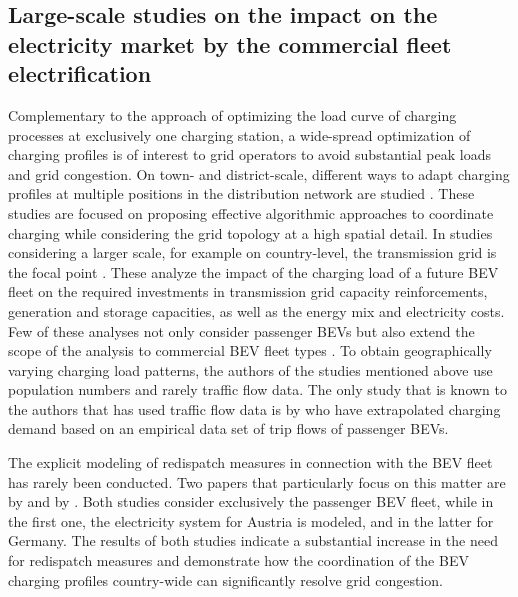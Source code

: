 \documentclass[final,10pt]{elsarticle}
\begin{document}
    \subsection{Large-scale studies on the impact on the electricity market by the commercial fleet electrification} \label{sec:2_2}
        Complementary to the approach of optimizing the load curve of charging processes at exclusively one charging station, a wide-spread optimization of charging profiles is of interest to grid operators to avoid substantial peak loads and grid congestion. On town- and district-scale, different ways to adapt charging profiles at multiple positions in the distribution network are studied \cite{PRAKASH2022108235, OCONNELL2012106}. These studies are focused on proposing effective algorithmic approaches to coordinate charging while considering the grid topology at a high spatial detail. In studies considering a larger scale, for example on country-level, the transmission grid is the focal point \cite{CROZIER2020114973, HARTVIGSSON2022125180}. These analyze the impact of the charging load of a future \ac{BEV} fleet on the required investments in transmission grid capacity reinforcements, generation and storage capacities, as well as the energy mix and electricity costs. Few of these analyses not only consider passenger \ac{BEV}s but also extend the scope of the analysis to commercial \ac{BEV} fleet types \cite{9530709, LI2021111962}. To obtain geographically varying charging load patterns, the authors of the studies mentioned above use population numbers and rarely traffic flow data. The only study that is known to the authors that has used traffic flow data is by \citet{HARTVIGSSON2022125180} who have extrapolated charging demand based on an empirical data set of trip flows of passenger \ac{BEV}s.
        
        The explicit modeling of redispatch measures in connection with the \ac{BEV} fleet has rarely been conducted. Two papers that particularly focus on this matter are by \citet{LOSCHAN2023108802}  and by \citet{STAUDT20181435}. Both studies consider exclusively the passenger \ac{BEV} fleet, while in the first one, the electricity system for Austria is modeled, and in the latter for Germany. The results of both studies indicate a substantial increase in the need for redispatch measures and demonstrate how the coordination of the \ac{BEV} charging profiles country-wide can significantly resolve grid congestion.
\end{document}
